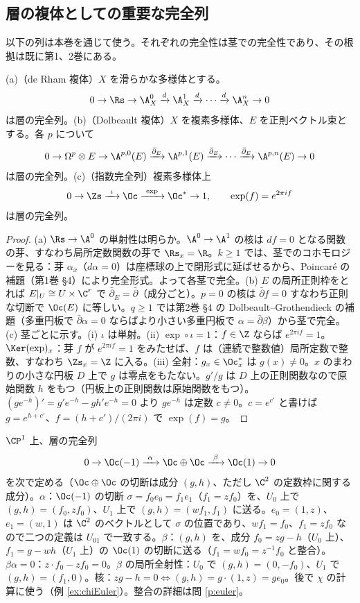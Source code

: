 \subsection{層の複体としての重要な完全列}
以下の列は本巻を通じて使う。それぞれの完全性は茎での完全性であり、その根拠は既に第1、2巻にある。
\begin{prop}\label{prop:resolutions}\tP
(a)（de Rham 複体）$X$ を滑らかな多様体とする。
\[
0\to\Rs\to\A^0_X\xrightarrow{d}\A^1_X\xrightarrow{d}\cdots\xrightarrow{d}\A^n_X\to0
\]
は層の完全列。(b)（Dolbeault 複体）$X$ を複素多様体、$E$ を正則ベクトル束とする。各 $p$ について
\[
0\to\Omega^p\otimes E\to\A^{p,0}(E)\xrightarrow{\bar\partial_E}\A^{p,1}(E)\xrightarrow{\bar\partial_E}\cdots\xrightarrow{\bar\partial_E}\A^{p,n}(E)\to0
\]
は層の完全列。(c)（指数完全列）複素多様体上
\[
0\to\Zs\xrightarrow{\ \iota\ }\Oc\xrightarrow{\ \exp\ }\Oc^*\to1,\qquad \exp(f)=e^{2\pi if}
\]
は層の完全列。
\end{prop}
\begin{proof}
(a) $\Rs\to\A^0$ の単射性は明らか。$\A^0\to\A^1$ の核は $df=0$ となる関数の芽、すなわち局所定数関数の芽で $\Rs_x=\R$。$k\ge1$ では、茎でのコホモロジーを見る：芽 $\alpha_x$（$d\alpha=0$）は座標球の上で閉形式に延ばせるから、Poincar\'e の補題（第1巻 §4）により完全形式。よって各茎で完全。(b) $E$ の局所正則枠をとれば $E|_U\cong U\times\C^r$ で $\bar\partial_E=\bar\partial$（成分ごと）。$p=0$ の核は $\bar\partial f=0$ すなわち正則な切断で $\Oc(E)$ に等しい。$q\ge1$ では第2巻 §4 の Dolbeault--Grothendieck の補題（多重円板で $\bar\partial\alpha=0$ ならばより小さい多重円板で $\alpha=\bar\partial\beta$）から茎で完全。(c) 茎ごとに示す。(i) $\iota$ は単射。(ii) $\exp\circ\iota=1$：$f\in\Z$ ならば $e^{2\pi if}=1$。$\Ker(\exp)_x$：芽 $f$ が $e^{2\pi if}=1$ をみたせば、$f$ は（連続で整数値）局所定数で整数、すなわち $\Zs_x=\Z$ に入る。(iii) 全射：$g_x\in\Oc^*_x$ は $g(x)\ne0$。$x$ のまわりの小さな円板 $D$ 上で $g$ は零点をもたない。$g'/g$ は $D$ 上の正則関数なので原始関数 $h$ をもつ（円板上の正則関数は原始関数をもつ）。$(ge^{-h})'=g'e^{-h}-gh'e^{-h}=0$ より $ge^{-h}$ は定数 $c\ne0$。$c=e^{c'}$ と書けば $g=e^{h+c'}$、$f=(h+c')/(2\pi i)$ で $\exp(f)=g$。\qedhere
\end{proof}
\begin{ex}\label{ex:EulerP1}
$\CP^1$ 上、層の完全列
\[
0\to\Oc(-1)\xrightarrow{\ \alpha\ }\Oc\oplus\Oc\xrightarrow{\ \beta\ }\Oc(1)\to0
\]
を次で定める（$\Oc\oplus\Oc$ の切断は成分 $(g,h)$、ただし $\C^2$ の定数枠に関する成分）。$\alpha$：$\Oc(-1)$ の切断 $\sigma=f_0e_0=f_1e_1$（$f_1=zf_0$）を、$U_0$ 上で $(g,h)=(f_0,zf_0)$、$U_1$ 上で $(g,h)=(wf_1,f_1)$ に送る。$e_0=(1,z)$、$e_1=(w,1)$ は $\C^2$ のベクトルとして $\sigma$ の位置であり、$wf_1=f_0$、$f_1=zf_0$ なので二つの定義は $U_{01}$ で一致する。$\beta$：$(g,h)$ を、成分 $f_0=zg-h$（$U_0$ 上）、$f_1=g-wh$（$U_1$ 上）の $\Oc(1)$ の切断に送る（$f_1=wf_0=z^{-1}f_0$ と整合）。$\beta\alpha=0$：$z\cdot f_0-zf_0=0$。$\beta$ の局所全射性：$U_0$ で $(g,h)=(0,-f_0)$、$U_1$ で $(g,h)=(f_1,0)$。核：$zg-h=0\iff(g,h)=g\cdot(1,z)=ge_0$。後で $\chi$ の計算に使う（例 \ref{ex:chiEuler}）。整合の詳細は問 \ref{p:euler}。
\end{ex}
